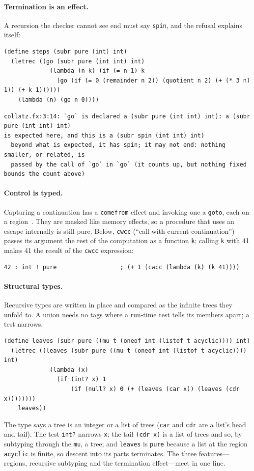 \documentclass[acmsmall,screen,review]{acmart}
\newcommand{\cd}[1]{\texttt{#1}}
\begin{document}
\paragraph{Termination is an effect.} A recursion the checker cannot
see end must say \cd{spin}, and the refusal explains itself:
\begin{lstlisting}
(define steps (subr pure (int) int)
  (letrec ((go (subr pure (int int) int)
             (lambda (n k) (if (= n 1) k
               (go (if (= 0 (remainder n 2)) (quotient n 2) (+ (* 3 n) 1)) (+ k 1))))))
    (lambda (n) (go n 0))))
\end{lstlisting}
\begin{lstlisting}[style=out]
collatz.fx:3:14: `go` is declared a (subr pure (int int) int): a (subr pure (int int) int)
is expected here, and this is a (subr spin (int int) int)
  beyond what is expected, it has spin; it may not end: nothing smaller, or related, is
  passed by the call of `go` in `go` (it counts up, but nothing fixed bounds the count above)
\end{lstlisting}

\paragraph{Control is typed.} Capturing a continuation has a
\cd{comefrom} effect and invoking one a \cd{goto}, each on a
region~\cite{jouvelot-gifford}. They are masked like memory effects, so
a procedure that uses an escape internally is still pure. Below,
\cd{cwcc} (``call with current continuation'') passes its argument the
rest of the computation as a function \cd{k}; calling \cd{k} with 41
makes 41 the result of the \cd{cwcc} expression:
\begin{lstlisting}[style=out]
42 : int ! pure                  ; (+ 1 (cwcc (lambda (k) (k 41))))
\end{lstlisting}

\paragraph{Structural types.} Recursive types are written in place and
compared as the infinite trees they unfold to. A union needs no tags
where a run-time test tells its members apart; a test narrows.
\begin{lstlisting}
(define leaves (subr pure ((mu t (oneof int (listof t acyclic)))) int)
  (letrec ((leaves (subr pure ((mu t (oneof int (listof t acyclic)))) int)
             (lambda (x)
               (if (int? x) 1
                   (if (null? x) 0 (+ (leaves (car x)) (leaves (cdr x))))))))
    leaves))
\end{lstlisting}
The type says a tree is an integer or a list of trees (\cd{car} and
\cd{cdr} are a list's head and tail). The test \cd{int?} narrows
\cd{x}; the tail \cd{(cdr x)} is a list of trees and so,
by subtyping through the \cd{mu}, a tree; and \cd{leaves} is \cd{pure}
because a list at the region \cd{acyclic} is finite, so descent into
its parts terminates. The three features---regions, recursive subtyping
and the termination effect---meet in one line.
\end{document}
